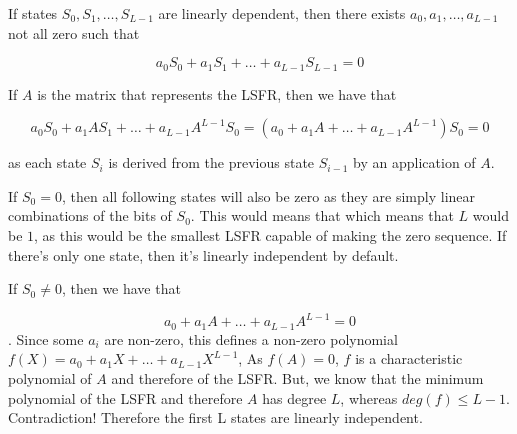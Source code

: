 \begin{enumerate}
If states $S_0, S_1, \dots, S_{L-1}$ are linearly dependent, then there exists
$a_0, a_1, \dots, a_{L-1}$ not all zero such that

\[a_0S_0 + a_1 S_1 + \dots + a_{L-1} S_{L-1} = 0 \]

If $A$ is the matrix that represents the LSFR, then we have that

\[a_0S_0 + a_1 A S_1 + \dots + a_{L-1} A^{L-1} S_0 = \left(a_0 + a_1 A +
\dots + a_{L-1} A^{L-1} \right) S_0 = 0 \]

as each state $S_i$ is derived from the previous state $S_{i-1}$ by an
application of $A$.

If $S_0=0$, then all following states will also be zero as
they are simply linear combinations of the bits of $S_0$. This would means that
which means that $L$ would be $1$, as this would be the smallest LSFR capable of
making the zero sequence. If there's only one state, then it's linearly
independent by default.

If $S_0 \neq 0$, then we have that

\[a_0 + a_1 A + \dots + a_{L-1} A^{L-1} = 0 \]. Since some $a_i$ are non-zero,
this defines a non-zero polynomial $f(X) = a_0 + a_1 X + \dots + a_{L-1}
X^{L-1}$, As $f(A) = 0$, $f$ is a characteristic polynomial of $A$ and therefore
of the LSFR.  But, we know that the minimum polynomial of the LSFR and therefore
$A$ has degree $L$, whereas $deg(f) \leq L - 1$. Contradiction! Therefore the
first L states are linearly independent.

\end{enumerate}
